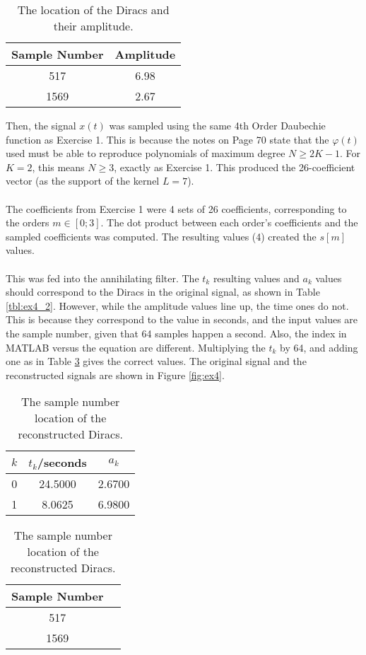 \documentclass[11pt,a4paper]{report}
\begin{document}
\begin{table}[!ht]
    \centering
    \begin{tabular}{|c|c|}
        \hline
        \textbf{Sample Number} & \textbf{Amplitude} \\ \hline
        517                    & 6.98 \\ \hline
        1569                   & 2.67 \\ \hline
    \end{tabular}
    \caption{The location of the Diracs and their amplitude.}
    \label{tbl:ex4_1}
\end{table}

Then, the signal $x(t)$ was sampled using the same 4th Order Daubechie function as Exercise 1. This is because the notes \cite{notes} on Page 70 state that the $\varphi(t)$ used must be able to reproduce polynomials of maximum degree $N \geq 2K -1$. For $K=2$, this means $N \geq 3$, exactly as Exercise 1. This produced the 26-coefficient vector (as the support of the kernel $L = 7$).
\\\\
The coefficients from Exercise 1 were 4 sets of 26 coefficients, corresponding to the orders $m \in [0;3]$. The dot product between each order's coefficients and the sampled coefficients was computed. The resulting values (4) created the $s[m]$ values.
\\\\
This was fed into the annihilating filter. The $t_k$ resulting values and $a_k$ values should correspond to the Diracs in the original signal, as shown in Table \ref{tbl:ex4_2}. However, while the amplitude values line up, the time ones do not. This is because they correspond to the value in seconds, and the input values are the sample number, given that 64 samples happen a second. Also, the index in MATLAB versus the equation are different. Multiplying the $t_k$ by 64, and adding one as in Table \ref{tbl:ex4_3} gives the correct values. The original signal and the reconstructed signals are shown in Figure \ref{fig:ex4}.

\begin{table}[!ht]
    \parbox{.45\linewidth}{
    \centering
    \begin{tabular}{|c|c|c|}
        \hline
        $k$     & $t_k$/seconds     & $a_k$ \\ \hline
        0       & 24.5000   & 2.6700\\ \hline
        1       & 8.0625   & 6.9800\\ \hline
    \end{tabular}
    \caption{Results of the annihilating filter: location and amplitude of Diracs.}
    \label{tbl:ex4_2}
    }
    \hfill
    \parbox{.45\linewidth}{
    \centering
    \begin{tabular}{|c|c|}
        \hline
        \textbf{Sample Number} \\ \hline
        517   \\ \hline
        1569  \\ \hline
    \end{tabular}
    \caption{The sample number location of the reconstructed Diracs.}
    \label{tbl:ex4_3}
    }
\end{table}
\end{document}
